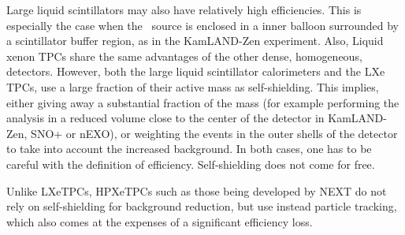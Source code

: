 %
Large liquid scintillators may also have relatively high efficiencies. This is especially the case when the \bb\ source is enclosed in a inner balloon surrounded by a scintillator buffer region, as in the KamLAND-Zen experiment. Also,
%
Liquid xenon TPCs share the same advantages of the other dense, homogeneous, detectors. However, both the large liquid scintillator calorimeters and the LXe TPCs, use a large fraction of their active mass as self-shielding. This implies, either giving away a substantial fraction of the mass (for example performing the analysis in a reduced volume close to the center of the detector in KamLAND-Zen, SNO+ or nEXO), or weighting the events in the outer shells of the detector to take into account the increased background. In both cases, one has to be careful with the definition of efficiency. Self-shielding does not come for free.  

Unlike LXeTPCs, HPXeTPCs such as those being developed by NEXT do not rely on self-shielding for background reduction, but use instead particle tracking, which also comes at the expenses of a significant efficiency loss.


